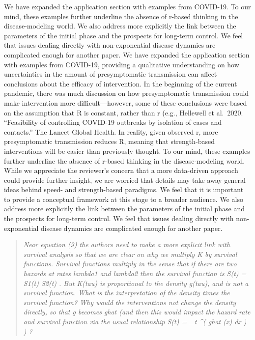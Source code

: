 We have expanded the application section with examples from COVID-19. To
our mind, these examples further underline the absence of r-based
thinking in the disease-modeling world. We also address more explicitly
the link between the parameters of the initial phase and the prospects
for long-term control. We feel that issues dealing directly with
non-exponential disease dynamics are complicated enough for another
paper.
We have expanded the
application section with examples from COVID-19, providing a qualitative
understanding on how uncertainties in the amount of presymptomatic
transmission can affect conclusions about the efficacy of intervention.
In the beginning of the current pandemic, there was much discussion on
how presymptomatic transmission could make intervention more
difficult---however, some of these conclusions were based on the
assumption that R is constant, rather than r (e.g., Hellewell et
al.~2020. ``Feasibility of controlling COVID-19 outbreaks by isolation
of cases and contacts.'' The Lancet Global Health. In reality, given
observed r, more presymptomatic transmission reduces R, meaning that
strength-based interventions will be easier than previously thought. To
our mind, these examples further underline the absence of r-based
thinking in the disease-modeling world. While we appreciate the
reviewer's concern that a more data-driven approach could provide
further insight, we are worried that details may take away general ideas
behind speed- and strength-based paradigms. We feel that it is important
to provide a conceptual framework at this stage to a broader audience.
We also address more explicitly the link between the parameters of the
initial phase and the prospects for long-term control. We feel that
issues dealing directly with non-exponential disease dynamics are
complicated enough for another paper.

\begin{quote}\sl
Near equation (9) the authors need to make a more explicit link with
survival analysis so that we are clear on why we multiply K by survival
functions. Survival functions multiply in the sense that if there are
two hazards at rates lambda1 and lambda2 then the survival function is
S(t) = S1(t) S2(t) . But K(tau) is proportional to the density g(tau),
and is not a survival function. What is the interpretation of the
density times the survival function? Why would the interventions not
change the density directly, so that g becomes ghat (and then this would
impact the hazard rate and survival function via the usual relationship
S(t) = \int_t ^\infty ( ghat (x) dx )  ) ?
\end{quote}


